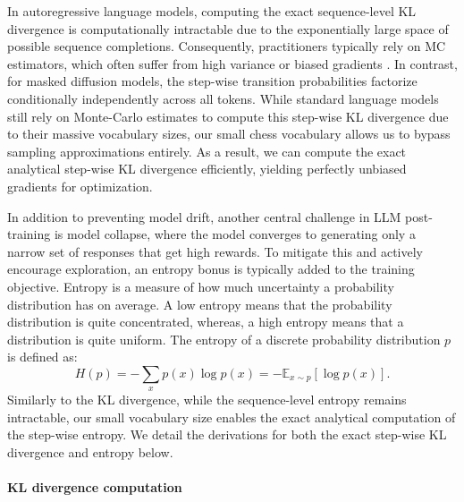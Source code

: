 In autoregressive language models, computing the exact sequence-level KL divergence is computationally intractable due to the exponentially large space of possible sequence completions. Consequently, practitioners typically rely on MC estimators, which often suffer from high variance \cite{schulman2020klblog} or biased gradients \cite{tang2025pitfallskldivergencegradient}. In contrast, for masked diffusion models, the step-wise transition probabilities factorize conditionally independently across all tokens. While standard language models still rely on Monte-Carlo estimates to compute this step-wise KL divergence due to their massive vocabulary sizes, our small chess vocabulary allows us to bypass sampling approximations entirely. As a result, we can compute the exact analytical step-wise KL divergence efficiently, yielding perfectly unbiased gradients for optimization.

In addition to preventing model drift, another central challenge in LLM post-training is model collapse, where the model converges to generating only a narrow set of responses that get high rewards. To mitigate this and actively encourage exploration, an entropy bonus is typically added to the training objective. Entropy is a measure of how much uncertainty a probability distribution has on average. A low entropy means that the probability distribution is quite concentrated, whereas, a high entropy means that a distribution is quite uniform. The entropy of a discrete probability distribution $p$ is defined as:
\begin{equation*}
    H(p) = -\sum_x p(x)\log p(x) = -\mathbb{E}_{x\sim p}[\log p(x)].
\end{equation*}
Similarly to the KL divergence, while the sequence-level entropy remains intractable, our small vocabulary size enables the exact analytical computation of the step-wise entropy. We detail the derivations for both the exact step-wise KL divergence and entropy below.


\paragraph{KL divergence computation}

